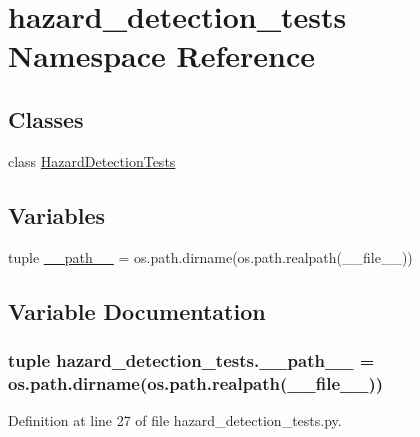 \hypertarget{namespacehazard__detection__tests}{\section{hazard\-\_\-detection\-\_\-tests Namespace Reference}
\label{namespacehazard__detection__tests}
}
\subsection*{Classes}
\begin{DoxyCompactItemize}
\item 
class \hyperlink{classhazard__detection__tests_1_1HazardDetectionTests}{Hazard\-Detection\-Tests}
\end{DoxyCompactItemize}
\subsection*{Variables}
\begin{DoxyCompactItemize}
\item 
tuple \hyperlink{namespacehazard__detection__tests_a51c526520ce23a72b87ea85baccd0544}{\-\_\-\-\_\-path\-\_\-\-\_\-} = os.\-path.\-dirname(os.\-path.\-realpath(\-\_\-\-\_\-file\-\_\-\-\_\-))
\end{DoxyCompactItemize}


\subsection{Variable Documentation}
\hypertarget{namespacehazard__detection__tests_a51c526520ce23a72b87ea85baccd0544}{
\subsubsection[{\-\_\-\-\_\-path\-\_\-\-\_\-}]{\setlength{\rightskip}{0pt plus 5cm}tuple hazard\-\_\-detection\-\_\-tests.\-\_\-\-\_\-path\-\_\-\-\_\- = os.\-path.\-dirname(os.\-path.\-realpath(\-\_\-\-\_\-file\-\_\-\-\_\-))}}\label{namespacehazard__detection__tests_a51c526520ce23a72b87ea85baccd0544}


Definition at line 27 of file hazard\-\_\-detection\-\_\-tests.\-py.

